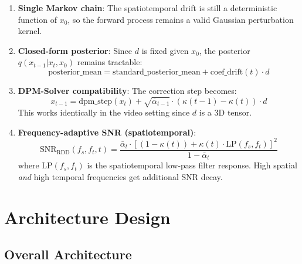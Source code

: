 \documentclass[11pt,a4paper]{article}
\begin{document}
\begin{enumerate}[nosep]
\item \textbf{Single Markov chain}: The spatiotemporal drift is still a deterministic function of $x_0$, so the forward process remains a valid Gaussian perturbation kernel.
\item \textbf{Closed-form posterior}: Since $d$ is fixed given $x_0$, the posterior $q(x_{t-1}|x_t,x_0)$ remains tractable:
\begin{equation}
\text{posterior\_mean} = \text{standard\_posterior\_mean} + \text{coef\_drift}(t) \cdot d
\end{equation}
\item \textbf{DPM-Solver compatibility}: The correction step becomes:
\begin{equation}
x_{t-1} = \text{dpm\_step}(x_t) + \sqrt{\bar\alpha_{t-1}} \cdot (\kappa(t-1) - \kappa(t)) \cdot d
\end{equation}
This works identically in the video setting since $d$ is a 3D tensor.
\item \textbf{Frequency-adaptive SNR (spatiotemporal)}:
\begin{equation}
\text{SNR}_\text{RDD}(f_s, f_t, t) = \frac{\bar\alpha_t \cdot [(1-\kappa(t)) + \kappa(t) \cdot \text{LP}(f_s, f_t)]^2}{1-\bar\alpha_t}
\end{equation}
where $\text{LP}(f_s, f_t)$ is the spatiotemporal low-pass filter response. High spatial \emph{and} high temporal frequencies get additional SNR decay.
\end{enumerate}

\section{Architecture Design}

\subsection{Overall Architecture}

\begin{center}
\end{center}
\end{document}
